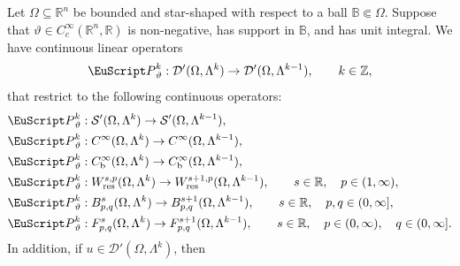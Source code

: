 \documentclass[10pt,a4paper]{amsart}
\theoremstyle{definition}
\theoremstyle{remark}
\numberwithin{equation}{section}
\newcommand{\bbB}{{\mathbb B}}
\newcommand{\bbR}{{\mathbb R}}
\newcommand{\bbZ}{{\mathbb Z}}
\newcommand{\calD}{{\mathcal D}}
\newcommand{\calS}{{\mathcal S}}
\newcommand{\euP}{{\EuScript P}}
\newcommand{\smallball}{\bbB}
\newcommand{\Domain}{{\Omega}}
\newcommand{\Alt}[1]{\Lambda^{#1}}
\newcommand{\Poincare}{\euP}
\newcommand{\weight}{\vartheta}
\newcommand{\Wres}{W_{\mathrm{res}}}
\newcommand{\bounded}{\mathrm{b}}
\begin{document}
\begin{theorem}\label{theorem:averaged-poincare-operator-on-domains}
    Let $\Domain \subseteq \bbR^{n}$ be bounded and star-shaped with respect to a ball $\smallball \Subset \Domain$.
    Suppose that $\weight \in C^{\infty}_{c}(\bbR^{n},\bbR)$ is non-negative, has support in $\smallball$, and has unit integral.
    We have continuous linear operators
    \begin{align}\label{math:averaged-poincare-operator-on-domains:distributions}
        \Poincare^{k}_{\weight} : \calD'(\Domain,\Alt{k}) \to \calD'(\Domain,\Alt{k-1}), \qquad k \in \bbZ, 
    \end{align}
    that restrict to the following continuous operators:
    \begin{subequations}\label{math:averaged-poincare-operator-on-domains:continuity}
    \begin{align}
        &\Poincare^{k}_{\weight} : \calS'(\Domain,\Alt{k}) \to \calS'(\Domain,\Alt{k-1}), \label{math:averaged-poincare-operator-on-domains:tempered-distributions}
        \\
        &\Poincare^{k}_{\weight} : C^{\infty}(\Domain,\Alt{k}) \to C^{\infty}(\Domain,\Alt{k-1}), \label{math:averaged-poincare-operator-on-domains:smooth}
        \\
        &\Poincare^{k}_{\weight} : C^{\infty}_{\bounded}(\Domain,\Alt{k}) \to C^{\infty}_{\bounded}(\Domain,\Alt{k-1}), \label{math:averaged-poincare-operator-on-domains:bounded-smooth}
        \\
        &\Poincare^{k}_{\weight} : \Wres^{s,p}(\Domain,\Alt{k}) \to \Wres^{s+1,p}(\Domain,\Alt{k-1}), \qquad s \in \bbR, \quad p \in (1,\infty), \label{math:averaged-poincare-operator-on-domains:sobolev}
        \\
        &\Poincare^{k}_{\weight} : B^{s}_{p,q}(\Domain,\Alt{k}) \to B^{s+1}_{p,q}(\Domain,\Alt{k-1}), \qquad s \in \bbR, \quad p,q \in (0,\infty], \label{math:averaged-poincare-operator-on-domains:besov}
        \\
        &\Poincare^{k}_{\weight} : F^{s}_{p,q}(\Domain,\Alt{k}) \to F^{s+1}_{p,q}(\Domain,\Alt{k-1}), \qquad s \in \bbR, \quad p \in (0,\infty), \quad q \in (0,\infty]. \label{math:averaged-poincare-operator-on-domains:triebellizorkin}
    \end{align}
    \end{subequations}
    In addition, if $u \in \calD'(\Domain,\Alt{k})$, then 
    \begin{subequations}\label{math:averaged-poincare-operator-on-domains:homotopy}

\end{subequations}
\end{theorem}
\end{document}
